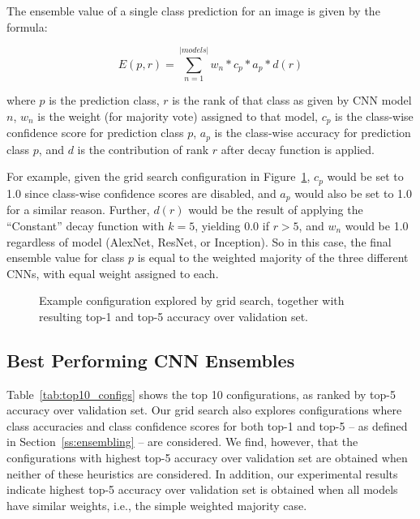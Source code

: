 The ensemble value of a single class prediction for an image is given by the formula:

$$E(p,r) = \sum_{n=1}^{|models|} w_n * c_p * a_p * d(r)$$

where $p$ is the prediction class, $r$ is the rank of that class as given by CNN model $n$, $w_n$ is the weight (for majority vote) assigned to that model, $c_p$ is the class-wise confidence score for prediction class $p$, $a_p$ is the class-wise accuracy for prediction class $p$, and $d$ is the contribution of rank $r$ after decay function is applied.

For example, given the grid search configuration in Figure~\ref{fig:gs_config}, $c_p$ would be set to 1.0 since class-wise confidence scores are disabled, and $a_p$ would also be set to 1.0 for a similar reason. Further, $d(r)$ would be the result of applying the ``Constant'' decay function with $k = 5$, yielding 0.0 if $r > 5$, and $w_n$ would be 1.0 regardless of model (AlexNet, ResNet, or Inception).  So in this case, the final ensemble value for class $p$ is equal to the weighted majority of the three different CNNs, with equal weight assigned to each.

\begin{figure}[!ht]

\caption{Example configuration explored by grid search, together with resulting top-1 and top-5 accuracy over validation set.}
\label{fig:gs_config}
\end{figure}

\subsection{Best Performing CNN Ensembles}

Table~\ref{tab:top10_configs} shows the top 10 configurations, as ranked by top-5 accuracy over validation set.  Our grid search also explores configurations where class accuracies and class confidence scores for both top-1 and top-5 -- as defined in Section~\ref{ss:ensembling} -- are considered.  We find, however, that the configurations with highest top-5 accuracy over validation set are obtained when neither of these heuristics are considered.  In addition, our experimental results indicate highest top-5 accuracy over validation set is obtained when all models have similar weights, i.e., the simple weighted majority case.